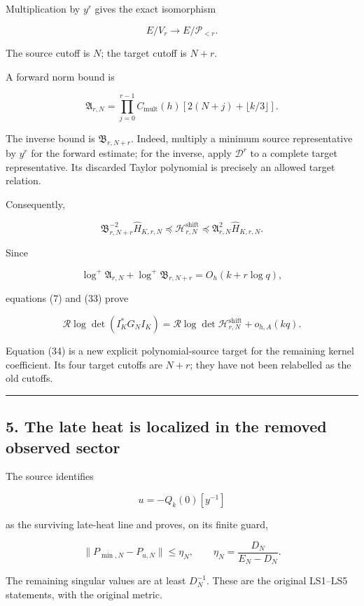 \documentclass[11pt]{article}
\begin{document}
Multiplication by \(y^r\) gives the exact isomorphism

\[
E/V_r\longrightarrow E/\mathcal P_{<r}.
\]

The source cutoff is \(N\); the target cutoff is \(N+r\).

A forward norm bound is

\[
\mathfrak A_{r,N}
=
\prod_{j=0}^{r-1}
C_{\mathrm{mult}}(h)
\left[2(N+j)+\lfloor k/3\rfloor\right].
\]

The inverse bound is \(\mathfrak B_{r,N+r}\). Indeed, multiply a minimum source representative by \(y^r\) for the forward estimate; for the inverse, apply \(\mathscr D^r\) to a complete target representative. Its discarded Taylor polynomial is precisely an allowed target relation.

Consequently,

\[
\boxed{
\mathfrak B_{r,N+r}^{-2}\widehat H_{K,r,N}
\preceq
\mathcal H^{\mathrm{shift}}_{r,N}
\preceq
\mathfrak A_{r,N}^{2}\widehat H_{K,r,N}.
}
\tag{33}
\]

Since

\[
\log^+\mathfrak A_{r,N}
+\log^+\mathfrak B_{r,N+r}
=
O_h(k+r\log q),
\]

equations (7) and (33) prove

\[
\boxed{
\mathcal R\log\det(I_K^*G_NI_K)
=
\mathcal R\log\det\mathcal H^{\mathrm{shift}}_{r,N}
+o_{h,A}(kq).
}
\tag{34}
\]

Equation (34) is a new explicit polynomial-source target for the remaining kernel coefficient. Its four target cutoffs are \(N+r\); they have not been relabelled as the old cutoffs.

\begin{center}\rule{0.5\linewidth}{0.5pt}\end{center}

\subsection{5. The late heat is localized in the removed observed sector}\label{the-late-heat-is-localized-in-the-removed-observed-sector}

The source identifies

\[
u=-Q_k(0)[y^{-1}]
\]

as the surviving late-heat line and proves, on its finite guard,

\[
\|P_{\min,N}-P_{u,N}\|\le\eta_N,
\qquad
\eta_N=\frac{D_N}{E_N-D_N}.
\]

The remaining singular values are at least \(D_N^{-1}\). These are the original LS1--LS5 statements, with the original metric.
\end{document}
